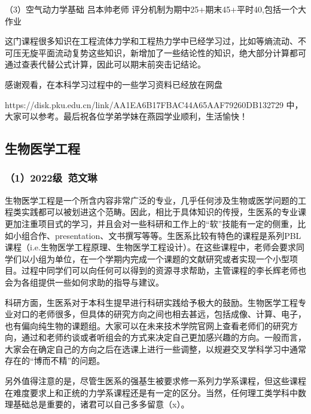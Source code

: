 \documentclass[11pt,oneside]{book}
\begin{document}
\vspace{10pt}

（3）空气动力学基础 吕本帅老师
评分机制为期中25+期末45+平时40,包括一个大作业

\vspace{10pt}

这门课程很多知识在工程流体力学和工程热力学中已经学习过，比如等熵流动、不可压无旋平面流动复势这些知识，新增加了一些结论性的知识，绝大部分计算都可通过查表代替公式计算，因此可以期末前突击记结论。

\vspace{10pt}

感谢观看，在本科学习过程中的一些学习资料已经放在网盘

https://disk.pku.edu.cn/link/AA1EA6B17FBAC44A65AAF79260DB132729
中，大家可以参考。最后祝各位学弟学妹在燕园学业顺利，生活愉快！

\subsection{生物医学工程}
\subsubsection{（1）2022级\ 范文琳}
生物医学工程是一个所含内容非常广泛的专业，几乎任何涉及生物或医学问题的工程类实践都可以被划进这个范畴。因此，相比于具体知识的传授，生医系的专业课更加注重项目式的学习，并且会对一些科研和工作上的“软”技能有一定的侧重，比如小组合作、presentation、文书撰写等等。生医系比较有特色的课程是系列PBL课程（i.e.生物医学工程原理、生物医学工程设计）。在这些课程中，老师会要求同学们以小组为单位，在一个学期内完成一个课题的文献研究或者实现一个小型项目。过程中同学们可以向任何可以得到的资源寻求帮助，主管课程的李长辉老师也会为各组提供一些如何求助的指导与建议。

\vspace{10pt}

科研方面，生医系对于本科生提早进行科研实践给予极大的鼓励。生物医学工程专业对口的老师很多，但具体的研究方向之间也相去甚远，包括成像、计算、电子，也有偏向纯生物的课题组。大家可以在未来技术学院官网上查看老师们的研究方向，通过和老师约谈或者听组会的方式来决定自己更加感兴趣的方向。一般而言，大家会在确定自己的方向之后在选课上进行一些调整，以规避交叉学科学习中通常存在的“博而不精”的问题。

\vspace{10pt}

另外值得注意的是，尽管生医系的强基生被要求修一系列力学系课程，但这些课程在难度要求上和正统的力学系课程还是有一定的区分。当然，任何理工类学科中数理基础总是重要的，诸君可以自己多多留意（x）。
\end{document}
